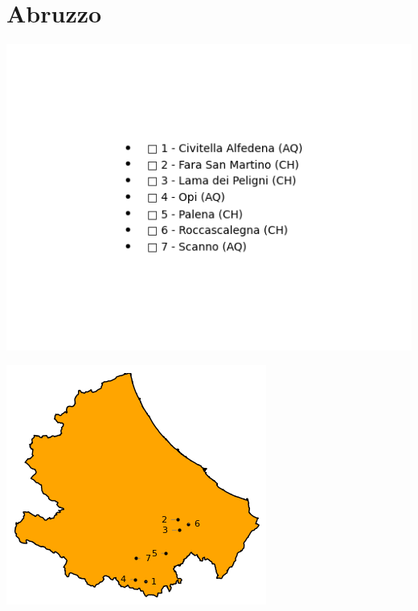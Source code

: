 \documentclass[a5paper,12pt]{article}
\begin{document}
\newpage

\section*{Abruzzo}

\newpage

\begin{center} %
	\includegraphics[width=\linewidth]{"Immagini Regione/abruzzo_map_legend.png"} 
\end{center}

\newpage

\begin{center} %
	\includegraphics[width=\linewidth]{"Immagini Regione/abruzzo_map_with_pins.png"} 
\end{center}
\end{document}
